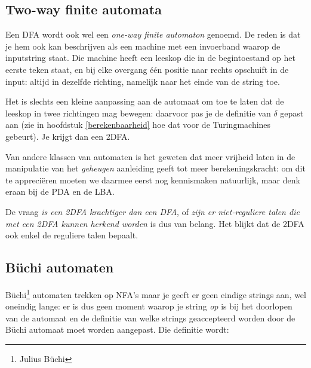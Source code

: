 \subsection{Two-way finite automata}

Een DFA wordt ook wel een {\em one-way finite automaton} genoemd. De
reden is dat je hem ook kan beschrijven als een machine met een
invoerband waarop de inputstring staat. Die machine heeft een leeskop
die in de begintoestand op het eerste teken staat, en bij elke
overgang \'{e}\'{e}n positie naar rechts opschuift in de input: altijd in
dezelfde richting, namelijk naar het einde van de string toe.


Het is slechts een kleine aanpassing aan de automaat om toe te laten
dat de leeskop in twee richtingen mag bewegen: daarvoor pas je de
definitie van $\delta$ gepast aan (zie in hoofdstuk
\ref{berekenbaarheid} hoe dat voor de Turingmachines gebeurt). 
Je krijgt dan een 2DFA.


Van andere klassen van automaten is het geweten dat meer vrijheid
laten in de manipulatie van het {\em geheugen} aanleiding geeft tot
meer berekeningskracht: om dit te appreci\"eren moeten we daarmee eerst
nog kennismaken natuurlijk, maar denk eraan bij de PDA en de LBA.


De vraag {\em is een 2DFA krachtiger dan een DFA}, of {\em zijn er
niet-reguliere talen die met een 2DFA kunnen herkend worden} is dus
van belang. Het blijkt dat de 2DFA ook enkel de reguliere talen
bepaalt.


\clearpage
\subsection{B\"{u}chi automaten}

B\"{u}chi\footnote{Julius B\"{u}chi} automaten trekken op NFA's maar
je geeft er geen eindige strings aan, wel oneindig lange: er is dus
geen moment waarop je string {\em op} is bij het doorlopen van de
automaat en de definitie van welke strings geaccepteerd worden door de
B\"{u}chi automaat moet worden aangepast. Die definitie wordt:


